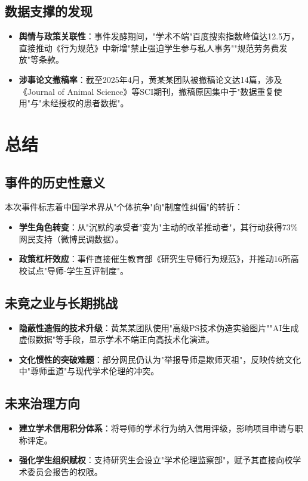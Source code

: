 \documentclass[12pt,a4paper]{article}
\begin{document}
\subsection{数据支撑的发现}
\begin{itemize}[leftmargin=*]
    \item \textbf{舆情与政策关联性}：事件发酵期间，"学术不端"百度搜索指数峰值达12.5万，直接推动《行为规范》中新增"禁止强迫学生参与私人事务""规范劳务费发放"等条款。
    \item \textbf{涉事论文撤稿率}：截至2025年4月，黄某某团队被撤稿论文达14篇，涉及《Journal of Animal Science》等SCI期刊，撤稿原因集中于"数据重复使用"与"未经授权的患者数据"。
\end{itemize}

\section{总结}
\subsection{事件的历史性意义}
本次事件标志着中国学术界从"个体抗争"向"制度性纠偏"的转折：
\begin{itemize}[leftmargin=*]
    \item \textbf{学生角色转变}：从"沉默的承受者"变为"主动的改革推动者"，其行动获得73\%网民支持（微博民调数据）。
    \item \textbf{政策杠杆效应}：事件直接催生教育部《研究生导师行为规范》，并推动16所高校试点"导师-学生互评制度"。
\end{itemize}

\subsection{未竟之业与长期挑战}
\begin{itemize}[leftmargin=*]
    \item \textbf{隐蔽性造假的技术升级}：黄某某团队使用"高级PS技术伪造实验图片""AI生成虚假数据"等手段，显示学术不端正向高技术化演进。
    \item \textbf{文化惯性的突破难题}：部分网民仍认为"举报导师是欺师灭祖"，反映传统文化中"尊师重道"与现代学术伦理的冲突。
\end{itemize}

\subsection{未来治理方向}
\begin{itemize}[leftmargin=*]
    \item \textbf{建立学术信用积分体系}：将导师的学术行为纳入信用评级，影响项目申请与职称评定。
    \item \textbf{强化学生组织赋权}：支持研究生会设立"学术伦理监察部"，赋予其直接向校学术委员会报告的权限。
\end{itemize}
\end{document}
